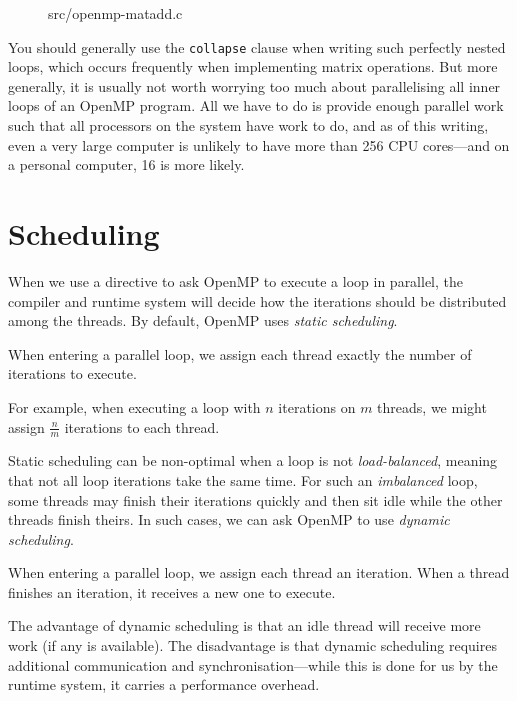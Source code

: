 \begin{figure}[!h]

{src/openmp-matadd.c}
\end{figure}

You should generally use the \texttt{collapse} clause when writing
such perfectly nested loops, which occurs frequently when implementing
matrix operations.  But more generally, it is usually not worth
worrying too much about parallelising all inner loops of an OpenMP
program.  All we have to do is provide enough parallel work such that
all processors on the system have work to do, and as of this writing,
even a very large computer is unlikely to have more than 256 CPU
cores---and on a personal computer, 16 is more likely.

\section{Scheduling}

When we use a directive to ask OpenMP to execute a loop in parallel,
the compiler and runtime system will decide how the iterations should
be distributed among the threads.  By default, OpenMP uses
\emph{static scheduling}.

\begin{definition}
  When entering a parallel loop, we assign each thread exactly the
  number of iterations to execute.
\end{definition}

For example, when executing a loop with $n$ iterations on $m$ threads,
we might assign $\frac{n}{m}$ iterations to each thread.

Static scheduling can be non-optimal when a loop is not
\emph{load-balanced}, meaning that not all loop iterations take the
same time.  For such an \emph{imbalanced} loop, some threads may
finish their iterations quickly and then sit idle while the other
threads finish theirs.  In such cases, we can ask OpenMP to use
\emph{dynamic scheduling}.

\begin{definition}
  When entering a parallel loop, we assign each thread an iteration.
  When a thread finishes an iteration, it receives a new one to
  execute.
\end{definition}

The advantage of dynamic scheduling is that an idle thread will
receive more work (if any is available).  The disadvantage is that
dynamic scheduling requires additional communication and
synchronisation---while this is done for us by the runtime system, it
carries a performance overhead.

